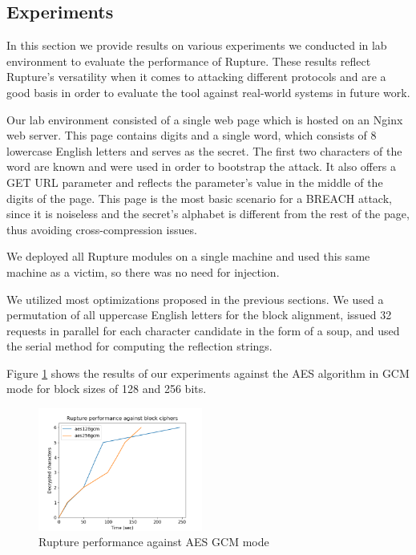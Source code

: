 \subsection{Experiments}\label{subsec:rupture_experiments}

In this section we provide results on various experiments we conducted in lab
environment to evaluate the performance of Rupture. These results reflect
Rupture's versatility when it comes to attacking different protocols and are a
good basis in order to evaluate the tool against real-world systems in future
work.

Our lab environment consisted of a single web page which is hosted on an Nginx
web server. This page contains digits and a single word, which consists of 8
lowercase English letters and serves as the secret. The first two characters of
the word are known and were used in order to bootstrap the attack. It also
offers a GET URL parameter and reflects the parameter's value in the middle of
the digits of the page. This page is the most basic scenario for a BREACH
attack, since it is noiseless and the secret's alphabet is different from the
rest of the page, thus avoiding cross-compression issues.

We deployed all Rupture modules on a single machine and used this same machine
as a victim, so there was no need for injection.

We utilized most optimizations proposed in the previous sections. We used a
permutation of all uppercase English letters for the block alignment,
issued 32 requests in parallel for each character candidate in the form of a
soup, and used the serial method for computing the reflection strings.

Figure \ref{fig:rupture_performance_aes_gcm} shows the results of our
experiments against the AES algorithm in GCM mode for block sizes of 128 and 256
bits.

   \begin{figure}[thpb]
      \centering
          \includegraphics[width=0.48\textwidth]{experiments/rupture_performance/rupture_performance.png}
      \caption{Rupture performance against AES GCM mode}
      \label{fig:rupture_performance_aes_gcm}
   \end{figure}

